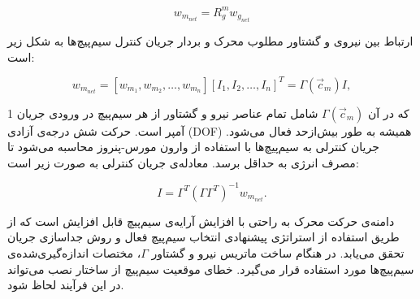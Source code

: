 \begin{equation}
	w_m_{net} = R^m_g w_g_{net}
\end{equation}

ارتباط بین نیروی و گشتاور مطلوب محرک و بردار جریان کنترل سیم‌پیچ‌ها به شکل زیر است:

\begin{equation}
	w_m_{net} = [w_m_1, w_m_2, \dots, w_m_n] [I_1, I_2, \dots, I_n]^T = \Gamma(\vec{c}_m) I,
\end{equation}

که در آن \( \Gamma(\vec{c}_m) \) شامل تمام عناصر نیرو و گشتاور از هر سیم‌پیچ در ورودی جریان 1 آمپر است. حرکت شش درجه‌ی آزادی (DOF) همیشه به طور بیش‌ازحد فعال می‌شود. جریان کنترلی به سیم‌پیچ‌ها با استفاده از وارون مورس-پنروز محاسبه می‌شود تا مصرف انرژی به حداقل برسد. معادله‌ی جریان کنترلی به صورت زیر است:

\begin{equation}
	I = \Gamma^T (\Gamma \Gamma^T)^{-1} w_m_{net}.
\end{equation}

دامنه‌ی حرکت محرک به راحتی با افزایش آرایه‌ی سیم‌پیچ قابل افزایش است که از طریق استفاده از استراتژی پیشنهادی انتخاب سیم‌پیچ فعال و روش جداسازی جریان تحقق می‌یابد. در هنگام ساخت ماتریس نیرو و گشتاور \( \Gamma \)، مختصات اندازه‌گیری‌شده‌ی سیم‌پیچ‌ها مورد استفاده قرار می‌گیرد. خطای موقعیت سیم‌پیچ از ساختار نصب می‌تواند در این فرآیند لحاظ شود.
